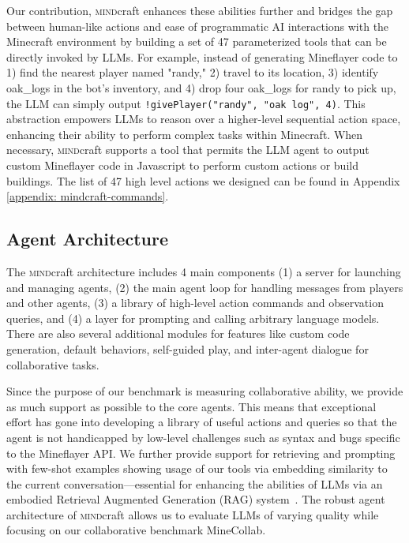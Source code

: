 \documentclass{article}
\newcommand{\mindcraft}{\textsc{mind}craft}
\begin{document}
Our contribution, \mindcraft{} enhances these abilities further and bridges the gap between human-like actions and ease of programmatic AI interactions with the Minecraft environment by building a set of 47 parameterized tools that can be directly invoked by LLMs.
For example, instead of generating Mineflayer code to 1) find the nearest player named "randy," 2) travel to its location, 3) identify oak\_logs in the bot's inventory, and 4) drop four oak\_logs for randy to pick up, the LLM can simply output \verb_!givePlayer("randy", "oak log", 4)_. 
This abstraction empowers LLMs to reason over a higher-level sequential action space, enhancing their ability to perform complex tasks within Minecraft.
When necessary, \mindcraft{} supports a tool that permits the LLM agent to output custom Mineflayer code in Javascript to perform custom actions or build buildings.
The list of 47 high level actions we designed can be found in Appendix \ref{appendix: mindcraft-commands}.








\subsection{Agent Architecture} 
The \mindcraft{} architecture includes 4 main components (1) a server for launching and managing agents, (2) the main agent loop for handling messages from players and other agents, (3) a library of high-level action commands and observation queries, and (4) a layer for prompting and calling arbitrary language models.
There are also several additional modules for features like custom code generation, default behaviors, self-guided play, and inter-agent dialogue for collaborative tasks.

Since the purpose of our benchmark is measuring collaborative ability, we provide as much support as possible to the core agents.
This means that exceptional effort has gone into developing a library of useful actions and queries so that the agent is not handicapped by low-level challenges such as syntax and bugs specific to the Mineflayer API.
We further provide support for retrieving and prompting with few-shot examples showing usage of our tools via embedding similarity to the current conversation---essential for enhancing the abilities of LLMs via an embodied Retrieval Augmented Generation (RAG) system~\citep{lewis2020retrieval}.
The robust agent architecture of \mindcraft{} allows us to evaluate LLMs of varying quality while focusing on our collaborative benchmark MineCollab.
\end{document}
